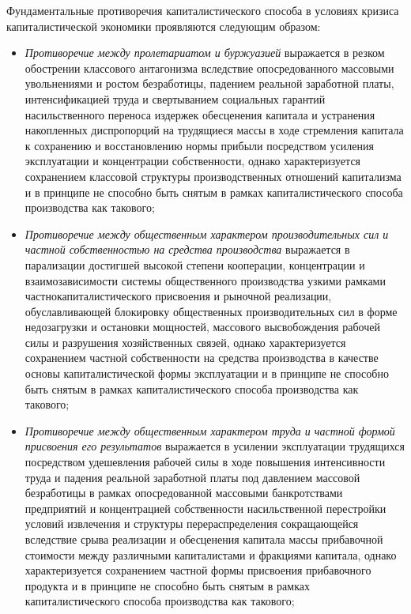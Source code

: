 Фундаментальные противоречия капиталистического способа в условиях кризиса капиталистической экономики проявляются следующим образом:
\begin{itemize}
    \item \textit{Противоречие между пролетариатом и буржуазией} выражается в резком обострении классового антагонизма вследствие опосредованного массовыми увольнениями и ростом безработицы, падением реальной заработной платы, интенсификацией труда и свертыванием социальных гарантий насильственного переноса издержек обесценения капитала и устранения накопленных диспропорций на трудящиеся массы в ходе стремления капитала к сохранению и восстановлению нормы прибыли посредством усиления эксплуатации и концентрации собственности, однако характеризуется сохранением классовой структуры производственных отношений капитализма и в принципе не способно быть снятым в рамках капиталистического способа производства как такового;
    \item \textit{Противоречие между общественным характером производительных сил и частной собственностью на средства производства} выражается в парализации достигшей высокой степени кооперации, концентрации и взаимозависимости системы общественного производства узкими рамками частнокапиталистического присвоения и рыночной реализации, обуславливающей блокировку общественных производительных сил в форме недозагрузки и остановки мощностей, массового высвобождения рабочей силы и разрушения хозяйственных связей, однако характеризуется сохранением частной собственности на средства производства в качестве основы капиталистической формы эксплуатации и в принципе не способно быть снятым в рамках капиталистического способа производства как такового;
    \item \textit{Противоречие между общественным характером труда и частной формой присвоения его результатов} выражается в усилении эксплуатации трудящихся посредством удешевления рабочей силы в ходе повышения интенсивности труда и падения реальной заработной платы под давлением массовой безработицы в рамках опосредованной массовыми банкротствами предприятий и концентрацией собственности насильственной перестройки условий извлечения и структуры перераспределения сокращающейся вследствие срыва реализации и обесценения капитала массы прибавочной стоимости между различными капиталистами и фракциями капитала, однако характеризуется сохранением частной формы присвоения прибавочного продукта и в принципе не способно быть снятым в рамках капиталистического способа производства как такового;

\end{itemize}
